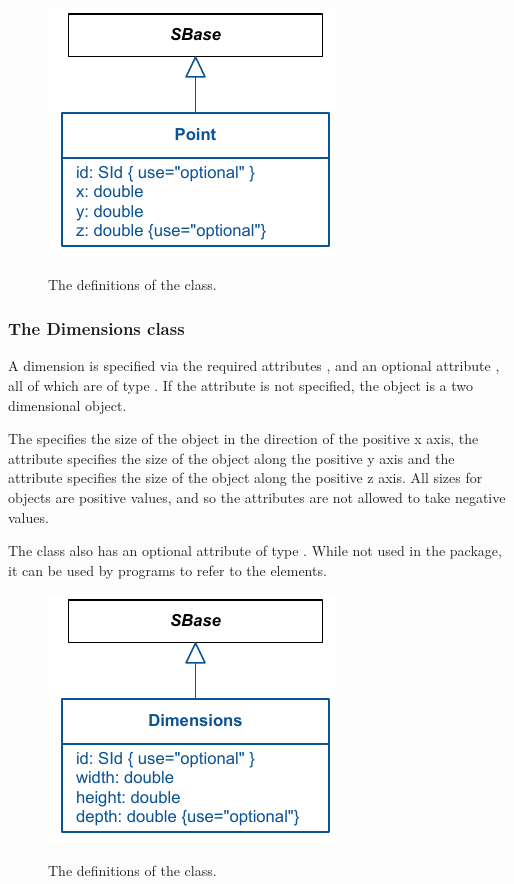 \begin{figure}[!h]
\includegraphics{uml/layout-point-uml}\\
\caption{The definitions of the \Point class.}
\label{uml:point}
\end{figure}

\subsubsection{The Dimensions class} \label{dimensions-class} A 
dimension is specified via the required attributes , 
 and an optional attribute , all of which are 
of type . If the attribute  is not 
specified, the object is a two dimensional object. 

The  specifies the size of the object in the direction of 
the positive x axis, the  attribute specifies the size of 
the object along the positive y axis and the  attribute 
specifies the size of the object along the positive z axis. All sizes 
for \Dimensions objects are positive values, and so the attributes are not allowed to take negative values. 

The \Dimensions class also has an optional attribute  of type 
. While not used in the \Layout package, it can be used by programs to refer to the elements. 


\begin{figure}[!h]
\includegraphics{uml/layout-dimensions-uml}\\
\label{uml:dimensions}
\caption{The definitions of the \Dimensions class.}
\end{figure}
